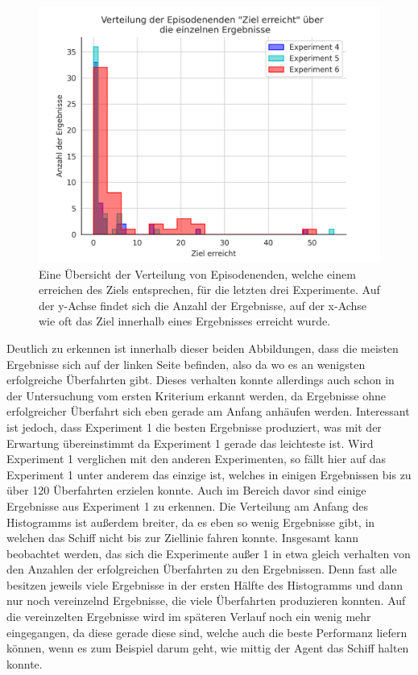 \documentclass[]{iat}
\begin{document}
\begin{figure}[H]
    \includegraphics[width=\textwidth]{graphics/goal_reached_histogram_2.png}
    \centering
    \caption{Eine Übersicht der Verteilung von Episodenenden, welche einem erreichen des Ziels entsprechen, für die letzten drei Experimente. Auf der y-Achse findet sich die Anzahl der Ergebnisse, auf der x-Achse wie oft das Ziel innerhalb eines Ergebnisses erreicht wurde.}
    \label{abb:histo2}
\end{figure}

Deutlich zu erkennen ist innerhalb dieser beiden Abbildungen, dass die meisten Ergebnisse sich auf der linken Seite befinden, also da wo es an wenigsten erfolgreiche Überfahrten gibt. Dieses verhalten konnte allerdings auch schon in der Untersuchung vom ersten Kriterium erkannt werden, da Ergebnisse ohne erfolgreicher Überfahrt sich eben gerade am Anfang anhäufen werden. Interessant ist jedoch, dass Experiment 1 die besten Ergebnisse produziert, was mit der Erwartung übereinstimmt da Experiment 1 gerade das leichteste ist. Wird Experiment 1 verglichen mit den anderen Experimenten, so fällt hier auf das Experiment 1 unter anderem das einzige ist, welches in einigen Ergebnissen bis zu über 120 Überfahrten erzielen konnte. Auch im Bereich davor sind einige Ergebnisse aus Experiment 1 zu erkennen. Die Verteilung am Anfang des Histogramms ist außerdem breiter, da es eben so wenig Ergebnisse gibt, in welchen das Schiff nicht bis zur Ziellinie fahren konnte. Insgesamt kann beobachtet werden, das sich die Experimente außer 1 in etwa gleich verhalten von den Anzahlen der erfolgreichen Überfahrten zu den Ergebnissen. Denn fast alle besitzen jeweils viele Ergebnisse in der ersten Hälfte des Histogramms und dann nur noch vereinzelnd Ergebnisse, die viele Überfahrten produzieren konnten. Auf die vereinzelten Ergebnisse wird im späteren Verlauf noch ein wenig mehr eingegangen, da diese gerade diese sind, welche auch die beste Performanz liefern können, wenn es zum Beispiel darum geht, wie mittig der Agent das Schiff halten konnte.
\end{document}
